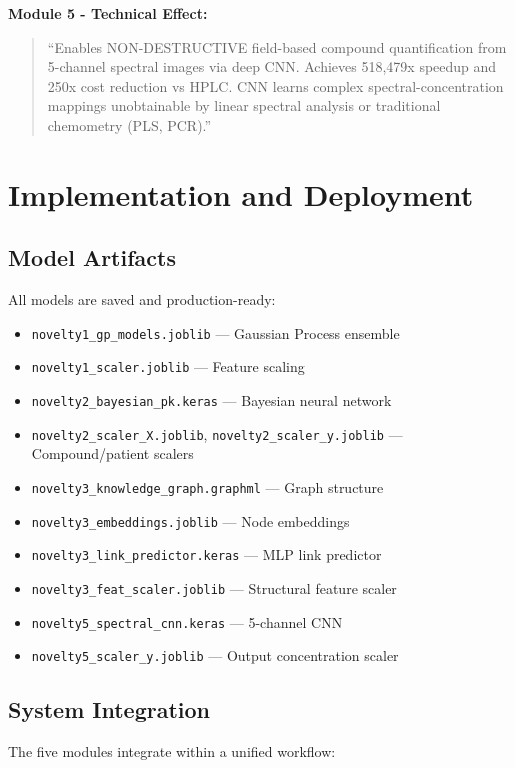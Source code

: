 \documentclass[11pt,a4paper]{article}
\begin{document}
\textbf{Module 5 - Technical Effect:}
\begin{quote}
``Enables NON-DESTRUCTIVE field-based compound quantification from 5-channel spectral images via deep CNN. Achieves 518,479x speedup and 250x cost reduction vs HPLC. CNN learns complex spectral-concentration mappings unobtainable by linear spectral analysis or traditional chemometry (PLS, PCR).''
\end{quote}

\section{Implementation and Deployment}

\subsection{Model Artifacts}

All models are saved and production-ready:

\begin{itemize}
    \item \texttt{novelty1\_gp\_models.joblib} — Gaussian Process ensemble
    \item \texttt{novelty1\_scaler.joblib} — Feature scaling
    \item \texttt{novelty2\_bayesian\_pk.keras} — Bayesian neural network
    \item \texttt{novelty2\_scaler\_X.joblib}, \texttt{novelty2\_scaler\_y.joblib} — Compound/patient scalers
    \item \texttt{novelty3\_knowledge\_graph.graphml} — Graph structure
    \item \texttt{novelty3\_embeddings.joblib} — Node embeddings
    \item \texttt{novelty3\_link\_predictor.keras} — MLP link predictor
    \item \texttt{novelty3\_feat\_scaler.joblib} — Structural feature scaler
    \item \texttt{novelty5\_spectral\_cnn.keras} — 5-channel CNN
    \item \texttt{novelty5\_scaler\_y.joblib} — Output concentration scaler
\end{itemize}

\subsection{System Integration}

The five modules integrate within a unified workflow:
\end{document}
